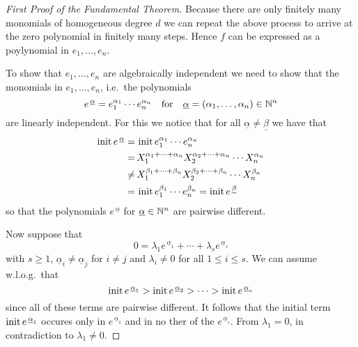 \begin{proof}[First Proof of the Fundamental Theorem]
  Because there are only finitely many monomials of homogeneous degree $d$ we can repeat the above process to arrive at the zero polynomial in finitely many steps.
  Hence $f$ can be expressed as a poylynomial in $e_1, \dotsc, e_n$.
  
  To show that $e_1, \dotsc, e_n$ are algebraically independent we need to show that the monomials in $e_1, \dotsc, e_n$, i.e.\ the polynomials
  \[
      e^{\,\underline{\alpha}}
    = e_1^{\alpha_1} \dotsm e_n^{\alpha_n}
    \quad\text{for}\quad
        \underline{\alpha}
    =   (\alpha_1, \dotsc, \alpha_n)
    \in \mathbb{N}^n
  \]
  are linearly independent.
  For this we notice that for all $\underline{\alpha} \neq \underline{\beta}$ we have that
  \begin{align*}
            \operatorname{init} e^{\,\underline{\alpha}}
       =&\, \operatorname{init} e_1^{\alpha_1} \dotsm e_n^{\alpha_n}   \\
       =&\, X_1^{\alpha_1 + \dotsb + \alpha_n} X_2^{\alpha_2 + \dotsb + \alpha_n} \dotsm X_n^{\alpha_n} \\
    \neq&\, X_1^{\beta_1 + \dotsb + \beta_n}   X_2^{\beta_2  + \dotsb + \beta_n}  \dotsm X_n^{\beta_n}  \\
       =&\, \operatorname{init} e_1^{\beta_1} \dotsm e_n^{\beta_n}
       =    \operatorname{init} e^{\,\underline{\beta}}
  \end{align*}
  so that the polynomials $e^{\,\underline{\alpha}}$ for $\underline{\alpha} \in \mathbb{N}^n$ are pairwise different.
  
  Now suppose that
  \[
      0
    = \lambda_1 e^{\,\underline{\alpha}_1} + \dotsb + \lambda_s e^{\,\underline{\alpha}_s}
  \]
  with $s \geq 1$, $\underline{\alpha}_i \neq \underline{\alpha}_j$ for $i \neq j$ and $\lambda_i \neq 0$ for all $1 \leq i \leq s$.
  We can assume w.l.o.g.\ that 
  \[
      \operatorname{init} e^{\,\underline{\alpha}_1}
    > \operatorname{init} e^{\,\underline{\alpha}_2}
    > \dotsb
    > \operatorname{init} e^{\,\underline{\alpha}_s}
  \]
  since all of these terms are pairwise different.
  It follows that the initial term $\operatorname{init} e^{\,\underline{\alpha}_1}$ occures only in $e^{\,\underline{\alpha}_1}$ and in no ther of the $e^{\,\underline{\alpha}_i}$.
  From $\lambda_1 = 0$, in contradiction to $\lambda_1 \neq 0$.
\end{proof}



